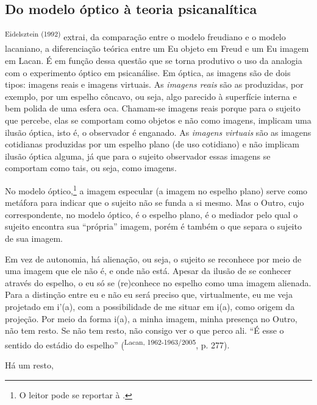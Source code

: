 \begin{multicols}{2}
\subsection*{Do modelo óptico à teoria psicanalítica}
\par{}\textsuperscript{Eidelsztein (\allowbreak{}1992)\allowbreak{}} extrai,\allowbreak{} da comparação entre o modelo freudiano e o modelo lacaniano,\allowbreak{} a diferenciação teórica entre um Eu objeto em Freud e um Eu imagem em Lacan.\allowbreak{} É em função dessa questão que se torna produtivo o uso da analogia com o experimento óptico em psicanálise.\allowbreak{} Em óptica,\allowbreak{} as imagens são de dois tipos:\allowbreak{} imagens reais e imagens virtuais.\allowbreak{} As \textit{imagens reais }são as produzidas,\allowbreak{} por exemplo,\allowbreak{} por um espelho côncavo,\allowbreak{} ou seja,\allowbreak{} algo parecido à superfície interna e bem polida de uma esfera oca.\allowbreak{} Chamam-\allowbreak{}se imagens reais porque para o sujeito que percebe,\allowbreak{} elas se comportam como objetos e não como imagens,\allowbreak{} implicam uma ilusão óptica,\allowbreak{} isto é,\allowbreak{} o observador é enganado.\allowbreak{} As \textit{imagens virtuais} são as imagens cotidianas produzidas por um espelho plano (\allowbreak{}de uso cotidiano)\allowbreak{} e não implicam ilusão óptica alguma,\allowbreak{} já que para o sujeito observador essas imagens se comportam como tais,\allowbreak{} ou seja,\allowbreak{} como imagens.\allowbreak{}\par{}No modelo óptico,\allowbreak{}\protect\footnote{ O leitor pode se reportar à .\allowbreak{}} a imagem especular (\allowbreak{}a imagem no espelho plano)\allowbreak{} serve como metáfora para indicar que o sujeito não se funda a si mesmo.\allowbreak{} Mas o Outro,\allowbreak{} cujo correspondente,\allowbreak{} no modelo óptico,\allowbreak{} é o espelho plano,\allowbreak{} é o mediador pelo qual o sujeito encontra sua “própria” imagem,\allowbreak{} porém é também o que separa o sujeito de sua imagem.\allowbreak{}\par{}Em vez de autonomia,\allowbreak{} há alienação,\allowbreak{} ou seja,\allowbreak{} o sujeito se reconhece por meio de uma imagem que ele não é,\allowbreak{} e onde não está.\allowbreak{} Apesar da ilusão de se conhecer através do espelho,\allowbreak{} o eu só se (\allowbreak{}re)\allowbreak{}conhece no espelho como uma imagem alienada.\allowbreak{} Para a distinção entre eu e não eu será preciso que,\allowbreak{} virtualmente,\allowbreak{} eu me veja projetado em i’(\allowbreak{}a)\allowbreak{},\allowbreak{} com a possibilidade de me situar em i(\allowbreak{}a)\allowbreak{},\allowbreak{} como origem da projeção.\allowbreak{} Por meio da forma i(\allowbreak{}a)\allowbreak{},\allowbreak{} a minha imagem,\allowbreak{} minha presença no Outro,\allowbreak{} não tem resto.\allowbreak{} Se não tem resto,\allowbreak{} não consigo ver o que perco ali.\allowbreak{} “É esse o sentido do estádio do espelho” (\allowbreak{}\textsuperscript{Lacan,\allowbreak{} 1962-\allowbreak{}1963\fshyp{}2005},\allowbreak{} p.\allowbreak{} 277)\allowbreak{}.\allowbreak{}\par{}Há um resto,\allowbreak{} 
\end{multicols}
